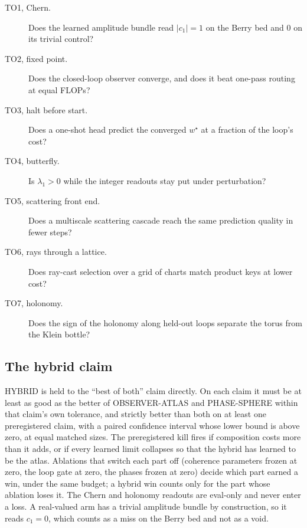 \begin{description}
  \item[TO1, Chern.] Does the learned amplitude bundle read $\lvert c_1\rvert=1$ on the Berry bed and $0$ on its trivial control?
  \item[TO2, fixed point.] Does the closed-loop observer converge, and does it beat one-pass routing at equal FLOPs?
  \item[TO3, halt before start.] Does a one-shot head predict the converged $w^\star$ at a fraction of the loop's cost?
  \item[TO4, butterfly.] Is $\lambda_1>0$ while the integer readouts stay put under perturbation?
  \item[TO5, scattering front end.] Does a multiscale scattering cascade reach the same prediction quality in fewer steps?
  \item[TO6, rays through a lattice.] Does ray-cast selection over a grid of charts match product keys at lower cost?
  \item[TO7, holonomy.] Does the sign of the holonomy along held-out loops separate the torus from the Klein bottle?
\end{description}

\subsection{The hybrid claim}

HYBRID is held to the ``best of both'' claim directly. On each claim it must be at least as good as the better of OBSERVER-ATLAS and PHASE-SPHERE within that claim's own tolerance, and strictly better than both on at least one preregistered claim, with a paired confidence interval whose lower bound is above zero, at equal matched sizes. The preregistered kill fires if composition costs more than it adds, or if every learned limit collapses so that the hybrid has learned to be the atlas. Ablations that switch each part off (coherence parameters frozen at zero, the loop gate at zero, the phases frozen at zero) decide which part earned a win, under the same budget; a hybrid win counts only for the part whose ablation loses it. The Chern and holonomy readouts are eval-only and never enter a loss. A real-valued arm has a trivial amplitude bundle by construction, so it reads $c_1=0$, which counts as a miss on the Berry bed and not as a void.
